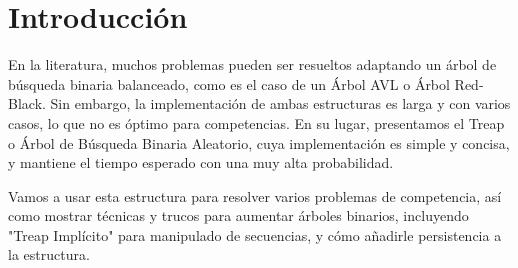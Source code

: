 \section{Introducción}

En la literatura, muchos problemas pueden ser resueltos adaptando un árbol de búsqueda binaria balanceado, como es el caso de un Árbol AVL o Árbol Red-Black.
Sin embargo, la implementación de ambas estructuras es larga y con varios casos, lo que no es óptimo para competencias.
En su lugar, presentamos el Treap o Árbol de Búsqueda Binaria Aleatorio, cuya implementación es simple y concisa,
y mantiene el tiempo esperado con una muy alta probabilidad.

Vamos a usar esta estructura para resolver varios problemas de competencia,
así como mostrar técnicas y trucos para aumentar árboles binarios,
incluyendo "Treap Implícito" para manipulado de secuencias, y cómo añadirle persistencia a la estructura.